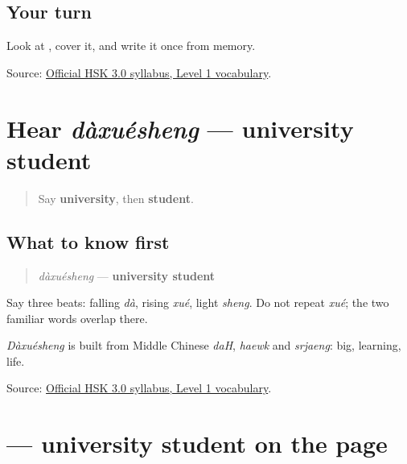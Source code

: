 \subsection*{Your turn}
Look at \textbf{}, cover it, and write it once from memory.

\begin{tcolorbox}[breakable,colback=teal!4,colframe=teal!35!black,title={Before you move on}]
Source: \href{https://hsk.cn-bj.ufileos.com/3.0/\%E6\%96\%B0\%E7\%89\%88HSK\%E8\%80\%83\%E8\%AF\%95\%E5\%A4\%A7\%E7\%BA\%B21219.pdf}{Official HSK 3.0 syllabus, Level 1 vocabulary}.
\end{tcolorbox}
\section[dàxuésheng]{Hear \emph{dàxuésheng} — university student}

\label{lesson:ZH-C13-hear-daxuesheng}



\begin{quote}
Say \textbf{university}, then \textbf{student}.
\end{quote}

\subsection*{What to know first}
\begin{quote}
\emph{dàxuésheng} — \textbf{university student}
\end{quote}

Say three beats: falling \emph{dà}, rising \emph{xué}, light \emph{sheng}. Do not repeat \emph{xué}; the two familiar words overlap there.

\emph{Dàxuésheng} is built from Middle Chinese \emph{daH}, \emph{haewk} and \emph{srjaeng}: big, learning, life.

\begin{tcolorbox}[breakable,colback=teal!4,colframe=teal!35!black,title={Before you move on}]
Source: \href{https://hsk.cn-bj.ufileos.com/3.0/\%E6\%96\%B0\%E7\%89\%88HSK\%E8\%80\%83\%E8\%AF\%95\%E5\%A4\%A7\%E7\%BA\%B21219.pdf}{Official HSK 3.0 syllabus, Level 1 vocabulary}.
\end{tcolorbox}
\section[\texorpdfstring{\zh{大学生} (dàxuésheng)}{大学生 (dàxuésheng)}]{ — university student on the page}

